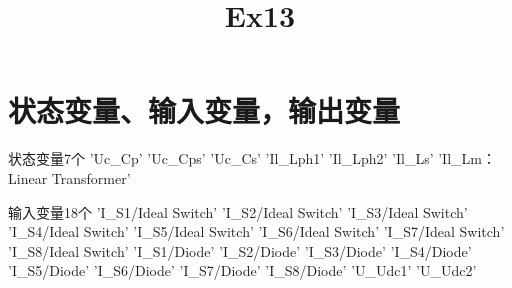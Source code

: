 \documentclass{article}
\title{Ex13}
\begin{document}
\newpage

\section{状态变量、输入变量，输出变量}

状态变量7个\newline{}   {       'Uc\_Cp'                    }   {       'Uc\_Cps'                   }   {       'Uc\_Cs'                    }   {       'Il\_Lph1'                  }   {       'Il\_Lph2'                  }   {       'Il\_Ls'                    }   {       'Il\_Lm：Linear Transformer'              }\newline
    

\indent 输入变量18个\newline{}   {      'I\_S1/Ideal Switch'         }   {      'I\_S2/Ideal Switch'         }   {      'I\_S3/Ideal Switch'                }   {      'I\_S4/Ideal Switch'                }   {      'I\_S5/Ideal Switch'                }   {      'I\_S6/Ideal Switch'                }   {      'I\_S7/Ideal Switch'                }   {      'I\_S8/Ideal Switch'                }   {      'I\_S1/Diode'         }   {      'I\_S2/Diode'         }   {      'I\_S3/Diode'                }   {      'I\_S4/Diode'                }   {      'I\_S5/Diode'                }   {      'I\_S6/Diode'                }   {      'I\_S7/Diode'                }   {      'I\_S8/Diode'                }   {      'U\_Udc1'    }   {      'U\_Udc2'        }\newline
\end{document}
